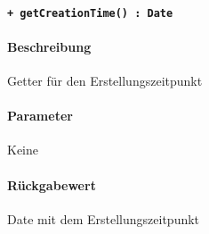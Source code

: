 \paragraph{\texttt{+ getCreationTime() : Date}}\label{AP_ChangeAction_getCreationTime}%
\paragraph*{Beschreibung}
Getter für den Erstellungszeitpunkt
\paragraph*{Parameter}
Keine
\paragraph*{Rückgabewert}
Date mit dem Erstellungszeitpunkt